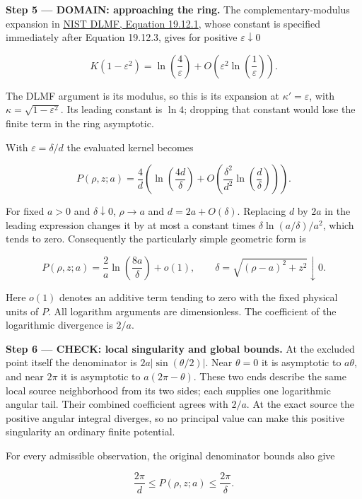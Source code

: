 \documentclass[11pt,oneside,openany]{book}
\begin{document}
\endgroup
\begin{DomainStep}
\textbf{Step 5 --- DOMAIN: approaching the ring.} The complementary-modulus expansion in \href{https://dlmf.nist.gov/19.12.E1}{NIST DLMF, Equation 19.12.1}, whose constant is specified immediately after Equation 19.12.3, gives for positive \(\varepsilon\downarrow0\)

\[
K(1-\varepsilon^2)
=\ln\left(\frac4\varepsilon\right)
+O\left(\varepsilon^2\ln\left(\frac1\varepsilon\right)\right).
\]

The DLMF argument is its modulus, so this is its expansion at \(\kappa'=\varepsilon\), with \(\kappa=\sqrt{1-\varepsilon^2}\). Its leading constant is \(\ln4\); dropping that constant would lose the finite term in the ring asymptotic.

With \(\varepsilon=\delta/d\) the evaluated kernel becomes

\[
P(\rho,z;a)=\frac4d\left(
\ln\left(\frac{4d}{\delta}\right)
+O\left(\frac{\delta^2}{d^2}\ln\left(\frac d\delta\right)\right)\right).
\]

For fixed \(a>0\) and \(\delta\downarrow0\), \(\rho\to a\) and \(d=2a+O(\delta)\). Replacing \(d\) by \(2a\) in the leading expression changes it by at most a constant times \(\delta\ln(a/\delta)/a^2\), which tends to zero. Consequently the particularly simple geometric form is

\[
P(\rho,z;a)=\frac2a\ln\left(\frac{8a}{\delta}\right)+o(1),
\qquad \delta=\sqrt{(\rho-a)^2+z^2}\downarrow0.
\]

Here \(o(1)\) denotes an additive term tending to zero with the fixed physical units of \(P\). All logarithm arguments are dimensionless. The coefficient of the logarithmic divergence is \(2/a\).

\end{DomainStep}
\textbf{Step 6 --- CHECK: local singularity and global bounds.} At the excluded point itself the denominator is \(2a|\sin(\theta/2)|\). Near \(\theta=0\) it is asymptotic to \(a\theta\), and near \(2\pi\) it is asymptotic to \(a(2\pi-\theta)\). These two ends describe the same local source neighborhood from its two sides; each supplies one logarithmic angular tail. Their combined coefficient agrees with \(2/a\). At the exact source the positive angular integral diverges, so no principal value can make this positive singularity an ordinary finite potential.

For every admissible observation, the original denominator bounds also give

\[
\frac{2\pi}{d}\le P(\rho,z;a)\le\frac{2\pi}{\delta}.
\]
\end{document}
